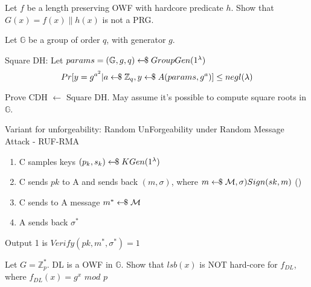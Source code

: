 \documentclass{exam}
\begin{document}
\begin{questions}

    \question
        Let $f$ be a length preserving OWF with hardcore predicate $h$.\newline
        Show that $G(x) = f(x) \| h(x)$ is not a PRG.

    \question
        Let $\mathbb{G}$ be a group of order $q$, with generator $g$.

        Square DH:\newline
        Let $params = (\mathbb{G},g,q) \leftarrow\kern-0.42em{\$} \; GroupGen(1^\lambda)$
        \[ Pr[y=g^{a^2} \vert a \leftarrow\kern-0.42em{\$} \; \mathbb{Z}_q, y \leftarrow\kern-0.42em{\$} \; A(params,g^a) ] \leq negl(\lambda) \]

        Prove CDH $\leftarrow$ Square DH. May assume it's possible to compute square roots in $\mathbb{G}$.
    \newpage

    \question
        Variant for unforgeability: Random UnForgeability under Random Message Attack - RUF-RMA

        \begin{enumerate}
            \item C samples keys $(p_k,s_k) \leftarrow\kern-0.42em{\$} \; KGen(1^\lambda)$
            \item C sends $pk$ to A and sends back $(m,\sigma)$, where $m \leftarrow\kern-0.42em{\$} \; \mathcal{M}, \sigma ) Sign(sk,m)$ (\poly) 
            \item C sends to A message $m^* \leftarrow\kern-0.42em{\$} \; \mathcal{M}$
            \item A sends back $\sigma^*$
        \end{enumerate}
        Output 1 is $Verify(pk,m^*,\sigma^*) = 1$


    \question
        Let $G = \mathbb{Z}_p^*$. DL is a OWF in $\mathbb{G}$.\newline
        Show that $lsb(x)$ is NOT hard-core for $f_{DL}$, where $f_{DL}(x) = g^x$ $mod$ $p$

\end{questions}
\end{document}
